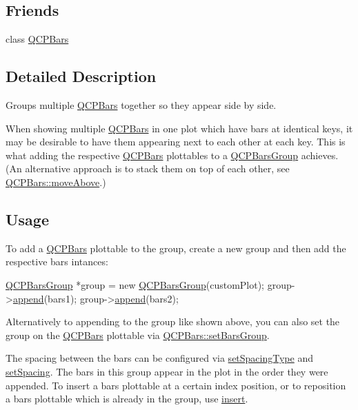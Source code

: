 \subsection*{Friends}
\begin{DoxyCompactItemize}
\item 
class \hyperlink{class_q_c_p_bars_group_a721b87c7cdb8e83a90d77fc8a22e7195}{Q\+C\+P\+Bars}
\end{DoxyCompactItemize}


\subsection{Detailed Description}
Groups multiple \hyperlink{class_q_c_p_bars}{Q\+C\+P\+Bars} together so they appear side by side. 



When showing multiple \hyperlink{class_q_c_p_bars}{Q\+C\+P\+Bars} in one plot which have bars at identical keys, it may be desirable to have them appearing next to each other at each key. This is what adding the respective \hyperlink{class_q_c_p_bars}{Q\+C\+P\+Bars} plottables to a \hyperlink{class_q_c_p_bars_group}{Q\+C\+P\+Bars\+Group} achieves. (An alternative approach is to stack them on top of each other, see \hyperlink{class_q_c_p_bars_ac22e00a6a41509538c21b04f0a57318c}{Q\+C\+P\+Bars\+::move\+Above}.)\hypertarget{class_q_c_p_bars_group_qcpbarsgroup-usage}{}\subsection{Usage}\label{class_q_c_p_bars_group_qcpbarsgroup-usage}
To add a \hyperlink{class_q_c_p_bars}{Q\+C\+P\+Bars} plottable to the group, create a new group and then add the respective bars intances\+: 
\begin{DoxyCode}
\hyperlink{class_q_c_p_bars_group}{QCPBarsGroup} *group = \textcolor{keyword}{new} \hyperlink{class_q_c_p_bars_group_aa4e043b9a22c6c5ea0f93740aca063e1}{QCPBarsGroup}(customPlot);
group->\hyperlink{class_q_c_p_bars_group_a809ed63cc4ff7cd5b0b8c96b470163d3}{append}(bars1);
group->\hyperlink{class_q_c_p_bars_group_a809ed63cc4ff7cd5b0b8c96b470163d3}{append}(bars2);
\end{DoxyCode}
 Alternatively to appending to the group like shown above, you can also set the group on the \hyperlink{class_q_c_p_bars}{Q\+C\+P\+Bars} plottable via \hyperlink{class_q_c_p_bars_aedd1709061f0b307c47ddb45e172ef9a}{Q\+C\+P\+Bars\+::set\+Bars\+Group}.

The spacing between the bars can be configured via \hyperlink{class_q_c_p_bars_group_a2c7e2d61b10594a4555b615e1fcaf49e}{set\+Spacing\+Type} and \hyperlink{class_q_c_p_bars_group_aa553d327479d72a0c3dafcc724a190e2}{set\+Spacing}. The bars in this group appear in the plot in the order they were appended. To insert a bars plottable at a certain index position, or to reposition a bars plottable which is already in the group, use \hyperlink{class_q_c_p_bars_group_a309a5f7233db189f3ea9c2d04ece6c13}{insert}.

